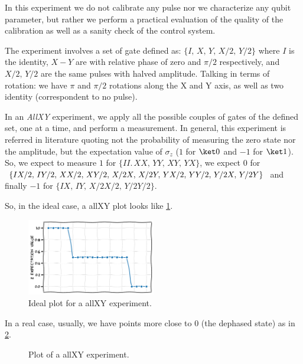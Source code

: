 
In this experiment we do not calibrate any pulse nor we characterize any qubit parameter, but rather we perform a practical evaluation of the quality of the calibration as well as a sanity check of the control system.

The experiment involves a set of gate defined as: $\{I,\,X,\,Y,\,X/2,\,Y/2\}$ where $I$ is the identity, $X-Y$ are \pipulse with relative phase of zero and $\pi/2$ respectively, and $X/2,\,Y/2$ are the same pulses with halved amplitude.
Talking in terms of rotation: we have $\pi$ and $\pi/2$ rotations along the X and Y axis, as well as two identity (correspondent to no pulse).

In an \textit{AllXY} experiment, we apply all the possible couples of gates of the defined set, one at a time, and perform a measurement.
In general, this experiment is referred in literature quoting not the probability of measuring the zero state nor the amplitude, but the expectation value of $\sigma_z$ ($1$ for $\ket 0$ and $-1$ for $\ket 1$).
So, we expect to measure $1$ for $\{II.\,XX,\,YY,\,XY,\,YX\}$, we expect $0$ for $\{IX/2,\,IY/2,\,XX/2,\,XY/2,\,X/2X,\,X/2Y,\\\,YX/2,\,YY/2,\,Y/2X,\,Y/2Y\}$ and finally $-1$ for $\{IX,\,IY,\,X/2X/2,\,Y/2Y/2\}$.

So, in the ideal case, a allXY plot looks like \cref{fig:sketch_allxy}.

\begin{figure}[ht]
    \centering
    \includegraphics[width=0.5\textwidth]{characterization/figures/allxy_sketch.pdf}
    \caption{Ideal plot for a allXY experiment.}
    \label{fig:sketch_allxy}
\end{figure}

In a real case, usually, we have points more close to $0$ (the dephased state) as in \cref{fig:good_allxy}.
\begin{figure}[ht]
    \caption{Plot of a allXY experiment.}
    \label{fig:good_allxy}
\end{figure}

